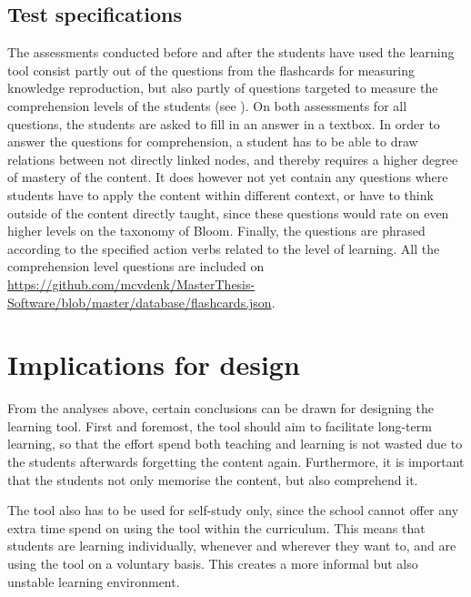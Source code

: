 
\subsection{Test specifications}

The assessments conducted before and after the students have used the learning tool consist partly out of the questions from the flashcards for measuring knowledge reproduction, but also partly of questions targeted to measure the comprehension levels of the students (see ). On both assessments for all questions, the students are asked to fill in an answer in a textbox. In order to answer the questions for comprehension, a student has to be able to draw relations between not directly linked nodes, and thereby requires a higher degree of mastery of the content. It does however not yet contain any questions where students have to apply the content within different context, or have to think outside of the content directly taught, since these questions would rate on even higher levels on the taxonomy of Bloom. Finally, the questions are phrased according to the specified action verbs related to the level of learning. All the comprehension level questions are included on \url{https://github.com/mcvdenk/MasterThesis-Software/blob/master/database/flashcards.json}.

\section{Implications for design}

From the analyses above, certain conclusions can be drawn for designing the learning tool. First and foremost, the tool should aim to facilitate long-term learning, so that the effort spend both teaching and learning is not wasted due to the students afterwards forgetting the content again. Furthermore, it is important that the students not only memorise the content, but also comprehend it.

The tool also has to be used for self-study only, since the school cannot offer any extra time spend on using the tool within the curriculum. This means that students are learning individually, whenever and wherever they want to, and are using the tool on a voluntary basis. This creates a more informal but also unstable learning environment.

